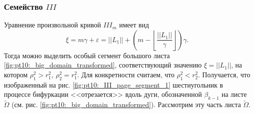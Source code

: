 \subsubsection{Семейство $III$}
Уравнение произвольной кривой $III_m$ имеет вид 
$$\xi = m \gamma + \varepsilon = ||L_1|| + \left(m - \left\lfloor \frac{||L_1||}{\gamma} \right\rfloor \right) \gamma.$$
Тогда можно выделить особый сегмент большого листа \ref{fig:pt10:_big_domain_transformed}, соответствующий значению $\xi=||L_1||$, на котором $\rho_1^2 > r_1^2, \ \rho_2^2 = r_1^2$.
Для конкретности считаем, что $\rho_1^2 < r_2^2$.
Получается, что изображенный на рис. \ref{fig:pt10:_III_page_segment_1} шестиугольник в процессе бифуркации <<отрезается>> вдоль дуги, обозначенной $\beta_{k-1}$ на листе $\widetilde{\Omega}$ (см. рис. \ref{fig:pt10:_big_domain_transformed}). 
Рассмотрим эту часть листа $\widetilde{\Omega}$.
